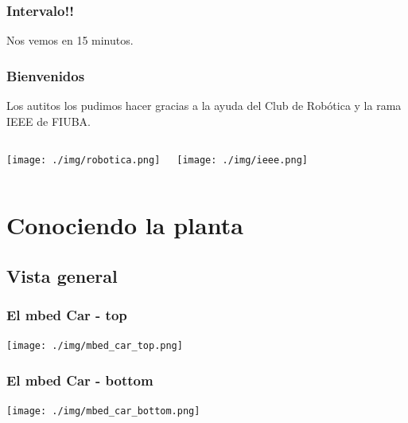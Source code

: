 \documentclass[compress]{beamer}
\begin{document}
\begin{frame}
 \frametitle{Intervalo!!}
\vspace{2cm}
\begin{center}
\Huge{Nos vemos en 15 minutos.}
\end{center}
\vspace{2cm}
\end{frame}

\begin{frame}
 \frametitle{Bienvenidos}

Los autitos los pudimos hacer gracias a la ayuda del Club de Robótica y la rama IEEE de FIUBA.
\begin{columns}
\begin{center}
 \texttt{[image: ./img/robotica.png]}
\end{center}
\begin{center}
 \texttt{[image: ./img/ieee.png]}
\end{center}
\end{columns}

\end{frame}

\section{Conociendo la planta}
\subsection{Vista general}
\begin{frame}
 \frametitle{El mbed Car - top}
\begin{center}
 \texttt{[image: ./img/mbed\_car\_top.png]}
\end{center}
\end{frame}

\begin{frame}
 \frametitle{El mbed Car - bottom}
\begin{center}
 \texttt{[image: ./img/mbed\_car\_bottom.png]}
\end{center}
\end{frame}
\end{document}

